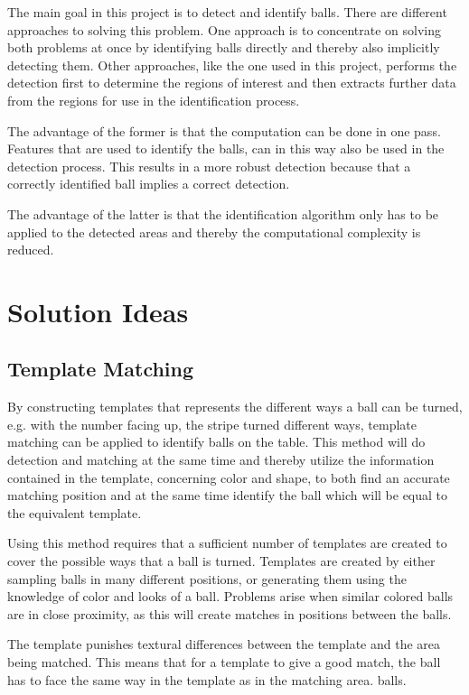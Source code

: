 The main goal in this project is to detect and identify balls. There are different approaches to solving this problem. One approach is to concentrate on solving both problems at once by identifying balls directly and thereby also implicitly detecting them. Other approaches, like the one used in this project, performs the detection first to determine the regions of interest and then extracts further data from the regions for use in the identification process.

The advantage of the former is that the computation can be done in one pass. Features that are used to identify the balls, can in this way also be used in the detection process. This results in a more robust detection because that a correctly identified ball implies a correct detection.

The advantage of the latter is that the identification algorithm only has to be applied to the detected areas and thereby the computational complexity is reduced.

\section{Solution Ideas}

\subsection{Template Matching}
By constructing templates that represents the different ways a ball can be turned, e.g. with the number facing up, the stripe turned different ways, template matching can be applied to identify balls on the table. This method will do detection and matching at the same time and thereby utilize the information contained in the template, concerning color and shape, to both find an accurate matching position and at the same time identify the ball which will be equal to the equivalent template.

Using this method requires that a sufficient number of templates are created to cover the possible ways that a ball is turned. Templates are created by either sampling balls in many different positions, or generating them using the knowledge of color and looks of a ball. Problems arise when similar colored balls are in close proximity, as this will create matches in positions between the balls.

The template punishes textural differences between the template and the area being matched. This means that for a template to give a good match, the ball has to face the same way in the template as in the matching area.
balls. 

